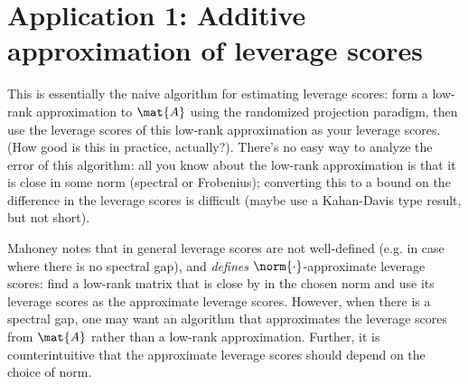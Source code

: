 
\section{Application 1: Additive approximation of leverage scores}

This is essentially the naive algorithm for estimating leverage scores: form a
low-rank approximation to $\mat{A}$ using the randomized projection paradigm,
then use the leverage scores of this low-rank approximation as your leverage
scores. (How good is this in practice, actually?). There's no easy way to
analyze the error of this algorithm: all you know about the low-rank
approximation is that it is close in some norm (spectral or Frobenius);
converting this to a bound on the difference in the leverage scores is difficult
(maybe use a Kahan-Davis type result, but not short). 

Mahoney notes that in general leverage scores are not well-defined (e.g. in case
where there is no spectral gap), and \emph{defines} $\norm{\cdot}$-approximate
leverage scores: find a low-rank matrix that is close by in the chosen norm and
use its leverage scores as the approximate leverage scores. However, when there
is a spectral gap, one may want an algorithm that approximates the leverage
scores from $\mat{A}$ rather than a low-rank approximation. Further, it is
counterintuitive that the approximate leverage scores should depend on the
choice of norm.

